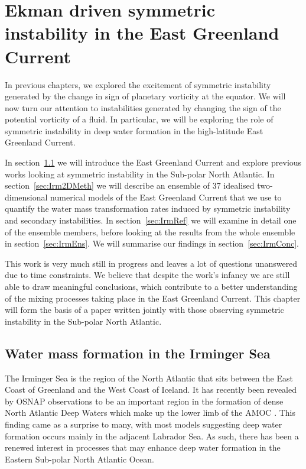 \chapter{Ekman driven symmetric instability in the East Greenland Current}
\label{chap:5}

In previous chapters, we explored the excitement of symmetric instability generated by the change in sign of planetary vorticity at the equator. We will now turn our attention to instabilities generated by changing the sign of the potential vorticity of a fluid. In particular, we will be exploring the role of symmetric instability in deep water formation in the high-latitude East Greenland Current.

In section~\ref{sec:IrmIntro} we will introduce the East Greenland Current and explore previous works looking at symmetric instability in the Sub-polar North Atlantic. In section~\ref{sec:Irm2DMeth} we will describe an ensemble of 37 idealised two-dimensional numerical models of the East Greenland Current that we use to quantify the water mass transformation rates induced by symmetric instability and secondary instabilities. In section~\ref{sec:IrmRef} we will examine in detail one of the ensemble members, before looking at the results from the whole ensemble in section~\ref{sec:IrmEns}. We will summarise our findings in section~\ref{sec:IrmConc}.

This work is very much still in progress and leaves a lot of questions unanswered due to time constraints. We believe that despite the work's infancy we are still able to draw meaningful conclusions, which contribute to a better understanding of the mixing processes taking place in the East Greenland Current. This chapter will form the basis of a paper written jointly with those observing symmetric instability in the Sub-polar North Atlantic.

\section{Water mass formation in the Irminger Sea}
\label{sec:IrmIntro}
The Irminger Sea is the region of the North Atlantic that sits between the East Coast of Greenland and the West Coast of Iceland. It has recently been revealed by OSNAP observations to be an important region in the formation of dense North Atlantic Deep Waters which make up the lower limb of the AMOC \citep{Lozier2019}. This finding came as a surprise to many, with most models suggesting deep water formation occurs mainly in the adjacent Labrador Sea. As such, there has been a renewed interest in processes that may enhance deep water formation in the Eastern Sub-polar North Atlantic Ocean.

